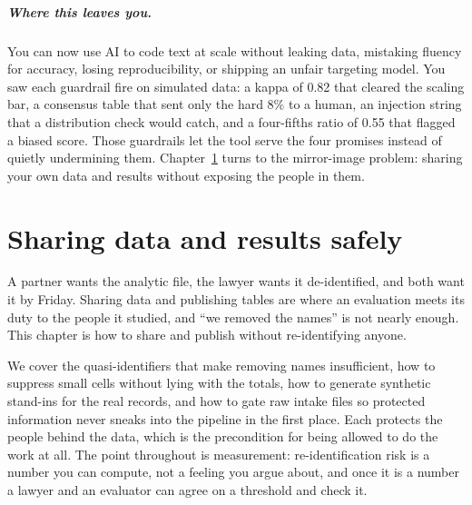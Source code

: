 \documentclass[
    a4paper,
    fontsize=10pt,
    twoside=true,
    numbers=noenddot,
]{kaobook}
\begin{document}
\paragraph{Where this leaves you.} You can now use AI to code text at scale without leaking data, mistaking fluency for accuracy, losing reproducibility, or shipping an unfair targeting model. You saw each guardrail fire on simulated data: a kappa of 0.82 that cleared the scaling bar, a consensus table that sent only the hard 8\% to a human, an injection string that a distribution check would catch, and a four-fifths ratio of 0.55 that flagged a biased score. Those guardrails let the tool serve the four promises instead of quietly undermining them. Chapter~\ref{ch:sharing} turns to the mirror-image problem: sharing your own data and results without exposing the people in them.
\chapter{Sharing data and results safely}\label{ch:sharing}

A partner wants the analytic file, the lawyer wants it de-identified, and both want it by Friday. Sharing data and publishing tables are where an evaluation meets its duty to the people it studied, and \enquote{we removed the names} is not nearly enough. This chapter is how to share and publish without re-identifying anyone.

We cover the quasi-identifiers that make removing names insufficient, how to suppress small cells without lying with the totals, how to generate synthetic stand-ins for the real records, and how to gate raw intake files so protected information never sneaks into the pipeline in the first place. Each protects the people behind the data, which is the precondition for being allowed to do the work at all. The point throughout is measurement: re-identification risk is a number you can compute, not a feeling you argue about, and once it is a number a lawyer and an evaluator can agree on a threshold and check it.
\end{document}
